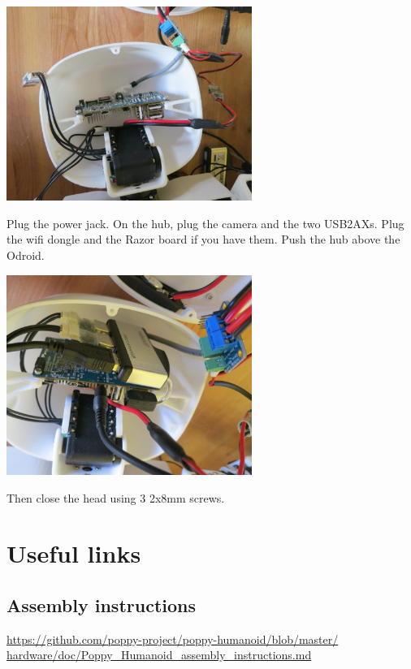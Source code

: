 \documentclass[includefoot]{article}
\begin{document}
  \begin{center}
  \includegraphics[width=0.6\textwidth]{img/head_odroid}
 \end{center}

Plug the power jack. On the hub, plug the camera and the two USB2AXs. Plug the wifi dongle and the Razor board if you have them. Push the hub above the Odroid.

  \begin{center}
  \includegraphics[width=0.6\textwidth]{img/head_final}
 \end{center}

Then close the head using 3 \diameter 2x8mm screws. %
 

 
\section{Useful links}
\label{documentation-links}

\subsection{Assembly instructions}

\begin{flushright}
\href{https://github.com/poppy-project/poppy-humanoid/blob/master/hardware/doc/Poppy_Humanoid_assembly_instructions.md}{https://github.com/poppy-project/poppy-humanoid/blob/master/ hardware/doc/Poppy\_Humanoid\_assembly\_instructions.md}
\end{flushright}
\end{document}
